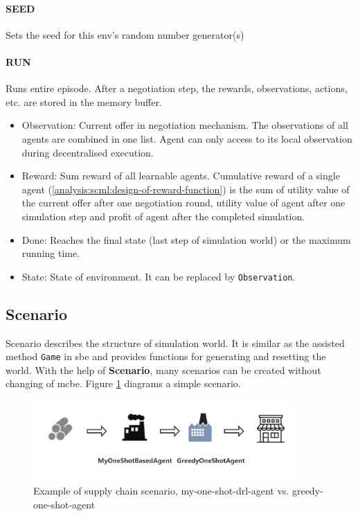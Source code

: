 \paragraph{SEED} Sets the seed for this env’s random number generator(s)
\paragraph{RUN} Runs entire episode. After a negotiation step, the rewards, observations, actions, etc. are stored in the memory buffer. 
\begin{itemize}
	\item Observation: Current offer in negotiation mechanism. The observations of all agents are combined in one list. Agent can only access to its local observation during decentralised execution.
	\item Reward: Sum reward of all learnable agents. Cumulative reward of a single agent (\ref{analysis:scml:design-of-reward-function}) is the sum of utility value of the current offer after one negotiation round, utility value of agent after one simulation step and profit of agent after the completed simulation.
	\item Done: Reaches the final state (last step of simulation world) or the maximum running time.
	\item State: State of environment. It can be replaced by \texttt{Observation}.
\end{itemize}

\subsection{Scenario} \label{scenario}
Scenario describes the structure of simulation world. It is similar as the assisted method \texttt{Game} in \gls{sbe} and provides functions for generating and resetting the world. With the help of \textbf{Scenario}, many scenarios can be created without changing of \gls{mcbe}. Figure \ref{fig:supply-chain-scenario-1} diagrams a simple scenario.

\begin{figure}[htbp]
\centering
\includegraphics[width=0.9\textwidth]{./images/supply-chain-scenario-1.png}
\caption{Example of supply chain scenario, \gls{my-one-shot-drl-agent} vs. \gls{greedy-one-shot-agent}}
\label{fig:supply-chain-scenario-1}
\end{figure}

